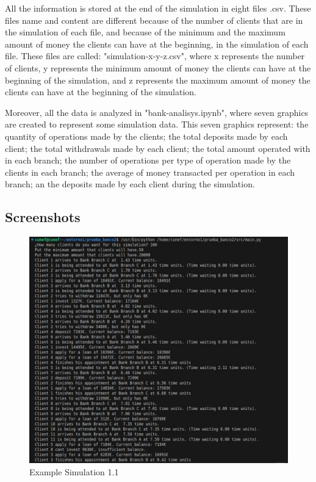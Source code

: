 \documentclass[titlepage, 12pt]{article}
\begin{document}
All the information is stored at the end of the simulation in eight files .csv. These files name and content are different because of the number of clients that are in the simulation of each file, and because of the minimum and the maximum amount of money the clients can have at the beginning, in the simulation of each file. These files are called: "simulation-x-y-z.csv", where x represents the number of clients, y represents the minimum amount of money the clients can have at the beginning of the simulation, and z represents the maximum amount of money the clients can have at the beginning of the simulation.

Moreover, all the data is analyzed in "bank-analisys.ipynb", where seven graphics are created to represent some simulation data. This seven graphics represent: the quantity of operations made by the clients; the total deposits made by each client; the total withdrawals made by each client; the total amount operated with in each branch; the number of operations per type of operation made by the clients in each branch; the average of money transacted per operation in each branch; an the deposits made by each client during the simulation.

\newpage

\subsection{Screenshots}

\begin{figure} [h]
    \centering
    \includegraphics[scale=0.5]{Screenshots/Example Simulation 1.1.jpeg}
    \caption{Example Simulation 1.1}
    \label{fig:Example Simulation 1.1}
\end{figure}
\end{document}

